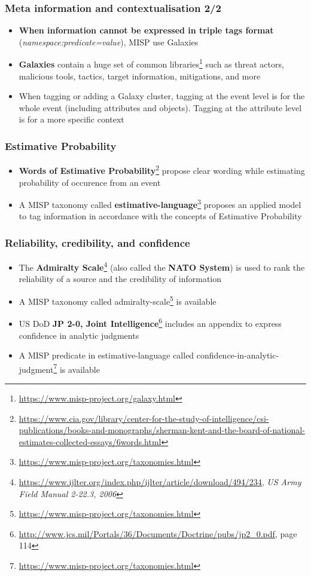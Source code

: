 \begin{frame}
\frametitle{Meta information and contextualisation 2/2}
\begin{itemize}
        \item {\bf When information cannot be expressed in triple tags format} ({\it namespace:predicate=value}), MISP use Galaxies
        \item {\bf Galaxies} contain a huge set of common libraries\footnote{\url{https://www.misp-project.org/galaxy.html}} such as threat actors, malicious tools, tactics, target information, mitigations, and more
        \item When tagging or adding a Galaxy cluster, tagging at the event level is for the whole event (including attributes and objects). Tagging at the attribute level is for a more specific context
\end{itemize}
\end{frame}

\begin{frame}
        \frametitle{Estimative Probability}
\begin{itemize}
        \item {\bf Words of Estimative Probability}\footnote{\url{https://www.cia.gov/library/center-for-the-study-of-intelligence/csi-publications/books-and-monographs/sherman-kent-and-the-board-of-national-estimates-collected-essays/6words.html}} propose clear wording while estimating probability of occurence from an event
        \item A MISP taxonomy called {\bf estimative-language}\footnote{\url{https://www.misp-project.org/taxonomies.html}} proposes an applied model to tag information in accordance with the concepts of Estimative Probability
\end{itemize}
\end{frame}

\begin{frame}
        \frametitle{Reliability, credibility, and confidence}
\begin{itemize}
        \item The {\bf Admiralty Scale}\footnote{\url{https://www.ijlter.org/index.php/ijlter/article/download/494/234}, {\it US Army Field Manual 2-22.3, 2006}} (also called the {\bf NATO System}) is used to rank the reliability of a source and the credibility of information
        \item A MISP taxonomy called admiralty-scale\footnote{\url{https://www.misp-project.org/taxonomies.html}} is available
        \item US DoD {\bf JP 2-0, Joint Intelligence}\footnote{\url{http://www.jcs.mil/Portals/36/Documents/Doctrine/pubs/jp2\_0.pdf}, page 114} includes an appendix to express confidence in analytic judgments
        \item A MISP predicate in estimative-language called confidence-in-analytic-judgment\footnote{\url{https://www.misp-project.org/taxonomies.html}} is available
\end{itemize}
\end{frame}


